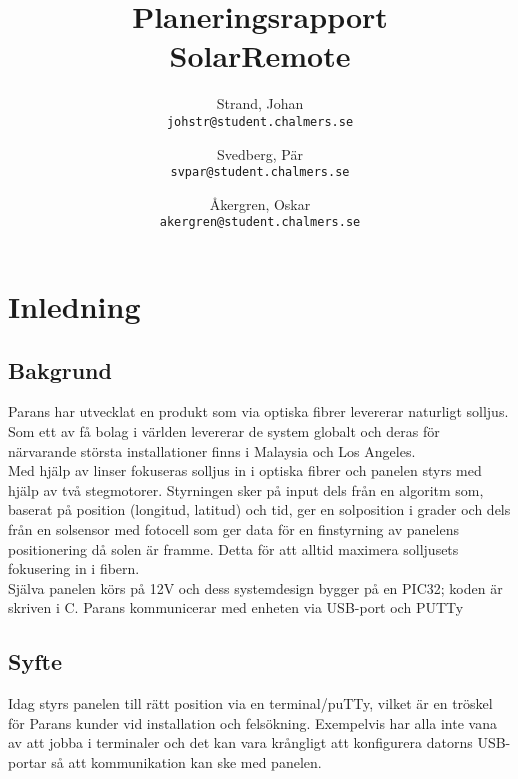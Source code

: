 \documentclass[a4paper]{article}
\author{	Strand, Johan \\ \texttt{johstr@student.chalmers.se} \and
			Svedberg, Pär\\ \texttt{svpar@student.chalmers.se} \and
			Åkergren, Oskar\\ \texttt{akergren@student.chalmers.se}
}
\title{Planeringsrapport \\ SolarRemote}
\begin{document}
	\maketitle
	\thispagestyle{empty}
	
	\newpage

	\tableofcontents
	\setcounter{page}{1}
	
	\newpage

	\section{Inledning} %
	\label{sec:inledning}
	
		\subsection{Bakgrund} %
		\label{sub:bakgrund}

			Parans har utvecklat en produkt som via optiska fibrer levererar naturligt solljus.
			Som ett av få bolag i världen levererar de system globalt och deras för närvarande största installationer finns i Malaysia och Los Angeles.\\

			\noindent Med hjälp av linser fokuseras solljus in i optiska fibrer och panelen styrs med hjälp av två stegmotorer. Styrningen sker på input dels från en algoritm som, baserat på position (longitud, latitud) och tid, ger en solposition i grader och dels från en solsensor med fotocell som ger data för en finstyrning av panelens positionering då solen är framme.
			Detta för att alltid maximera solljusets fokusering in i fibern.\\

			\noindent Själva panelen körs på 12V och dess systemdesign bygger på en PIC32; koden är skriven i C. Parans kommunicerar med enheten via USB-port och PUTTy

		\subsection{Syfte} %
		\label{sub:problem}

			Idag styrs panelen till rätt position via en terminal/puTTy, vilket är en tröskel för Parans kunder vid installation och felsökning. 
			Exempelvis har alla inte vana av att jobba i terminaler och det kan vara krångligt att konfigurera datorns USB-portar så att kommunikation kan ske med panelen. \\
\end{document}
